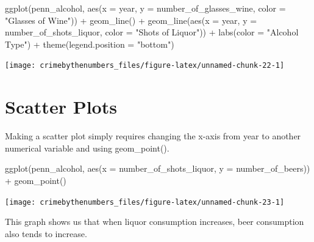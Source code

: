 \documentclass[
]{krantz}
\makeatletter
\newenvironment{Shaded}{\begin{snugshade}}{\end{snugshade}}
\newcommand{\AttributeTok}[1]{\textcolor[rgb]{0.61,0.61,0.61}{#1}}
\newcommand{\FunctionTok}[1]{\textcolor[rgb]{0,0,0}{#1}}
\newcommand{\NormalTok}[1]{#1}
\newcommand{\SpecialCharTok}[1]{\textcolor[rgb]{0,0,0}{#1}}
\newcommand{\StringTok}[1]{\textcolor[rgb]{0.5,0.5,0.5}{#1}}
\newenvironment{kframe}{%
\medskip{}
\setlength{\fboxsep}{.8em}
 \def\at@end@of@kframe{}%
 \ifinner\ifhmode%
  \def\at@end@of@kframe{\end{minipage}}%
  \begin{minipage}{\columnwidth}%
 \fi\fi%
 \def\FrameCommand##1{\hskip\@totalleftmargin \hskip-\fboxsep
 \colorbox{shadecolor}{##1}\hskip-\fboxsep
     \hskip-\linewidth \hskip-\@totalleftmargin \hskip\columnwidth}%
 \MakeFramed {\advance\hsize-\width
   \@totalleftmargin\z@ \linewidth\hsize
   \@setminipage}}%
 {\par\unskip\endMakeFramed%
 \at@end@of@kframe}
\renewenvironment{Shaded}{\begin{kframe}}{\end{kframe}}
\makeatother
\begin{document}
\begin{Shaded}
\begin{Highlighting}[]
\FunctionTok{ggplot}\NormalTok{(penn\_alcohol, }\FunctionTok{aes}\NormalTok{(}\AttributeTok{x =}\NormalTok{ year, }\AttributeTok{y =}\NormalTok{ number\_of\_glasses\_wine,}
                         \AttributeTok{color =} \StringTok{"Glasses of Wine"}\NormalTok{)) }\SpecialCharTok{+}
  \FunctionTok{geom\_line}\NormalTok{() }\SpecialCharTok{+}
  \FunctionTok{geom\_line}\NormalTok{(}\FunctionTok{aes}\NormalTok{(}\AttributeTok{x =}\NormalTok{ year, }\AttributeTok{y =}\NormalTok{ number\_of\_shots\_liquor,}
                \AttributeTok{color =} \StringTok{"Shots of Liquor"}\NormalTok{)) }\SpecialCharTok{+}
  \FunctionTok{labs}\NormalTok{(}\AttributeTok{color =} \StringTok{"Alcohol Type"}\NormalTok{) }\SpecialCharTok{+}
  \FunctionTok{theme}\NormalTok{(}\AttributeTok{legend.position =} \StringTok{"bottom"}\NormalTok{)}
\end{Highlighting}
\end{Shaded}

\begin{center}\texttt{[image: crimebythenumbers\_files/figure-latex/unnamed-chunk-22-1]} \end{center}

\hypertarget{scatter-plots}{%
\section{Scatter Plots}\label{scatter-plots}}

Making a scatter plot simply requires changing the x-axis from year to another numerical variable and using geom\_point().

\begin{Shaded}
\begin{Highlighting}[]
\FunctionTok{ggplot}\NormalTok{(penn\_alcohol, }\FunctionTok{aes}\NormalTok{(}\AttributeTok{x =}\NormalTok{ number\_of\_shots\_liquor,}
                         \AttributeTok{y =}\NormalTok{ number\_of\_beers)) }\SpecialCharTok{+}
  \FunctionTok{geom\_point}\NormalTok{()}
\end{Highlighting}
\end{Shaded}

\begin{center}\texttt{[image: crimebythenumbers\_files/figure-latex/unnamed-chunk-23-1]} \end{center}

This graph shows us that when liquor consumption increases, beer consumption also tends to increase.
\end{document}
